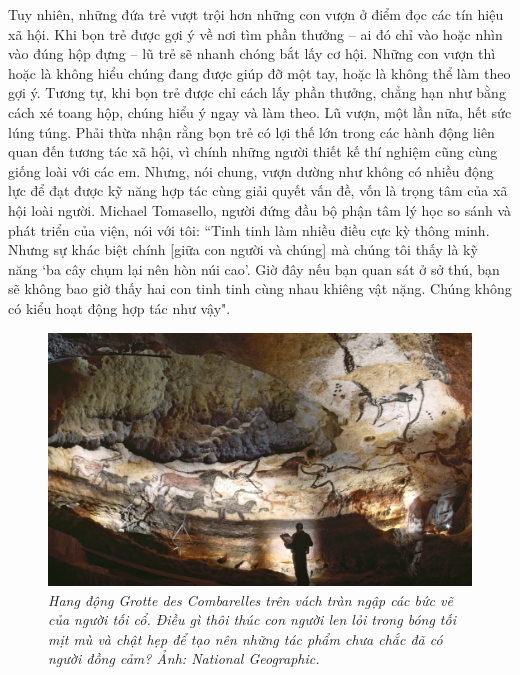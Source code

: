 \begin{multicols}{2}
	\vskip 0.1cm
	Tuy nhiên, những đứa trẻ vượt trội hơn những con vượn ở điểm đọc các tín hiệu xã hội. Khi bọn trẻ được gợi ý về nơi tìm phần thưởng -- ai đó chỉ vào hoặc nhìn vào đúng hộp đựng -- lũ trẻ sẽ nhanh chóng bắt lấy cơ hội. Những con vượn thì hoặc là không hiểu chúng đang được giúp đỡ một tay, hoặc là không thể làm theo gợi ý. Tương tự, khi bọn trẻ được chỉ cách lấy phần thưởng, chẳng hạn như bằng cách xé toang hộp, chúng hiểu ý ngay và làm theo. Lũ vượn, một lần nữa, hết sức lúng túng. Phải thừa nhận rằng bọn trẻ có lợi thế lớn trong các hành động liên quan đến tương tác xã hội, vì chính những người thiết kế thí nghiệm cũng cùng giống loài với các em. Nhưng, nói chung, vượn dường như không có nhiều động lực để đạt được kỹ năng hợp tác cùng giải quyết vấn đề, vốn là trọng tâm của xã hội loài người.
	\vskip 0.1cm
	Michael Tomasello, người đứng đầu bộ phận tâm lý học so sánh và phát triển của viện, nói với tôi: ``Tinh tinh làm nhiều điều cực kỳ thông minh. Nhưng sự khác biệt chính [giữa con người và chúng] mà chúng tôi thấy là kỹ năng ‘ba cây chụm lại nên hòn núi cao’. Giờ đây nếu bạn quan sát ở sở thú, bạn sẽ không bao giờ thấy hai con tinh tinh cùng nhau khiêng vật nặng. Chúng không có kiểu hoạt động hợp tác như vậy".
	\begin{figure}[H]
		\vspace*{-5pt}
		\centering
		\captionsetup{labelformat= empty, justification=centering}
		\includegraphics[width= 1\linewidth]{5}
		\caption{\small\textit{\color{timhieukhoahoc}Hang động Grotte des Combarelles trên vách tràn ngập các bức vẽ của người tối cổ. Điều gì thôi thúc con người len lỏi trong bóng tối mịt mù và chật hẹp để tạo nên những tác phẩm chưa chắc đã có người đồng cảm? Ảnh: National Geographic.}}
		\vspace*{-10pt}
	\end{figure}

\end{multicols}
